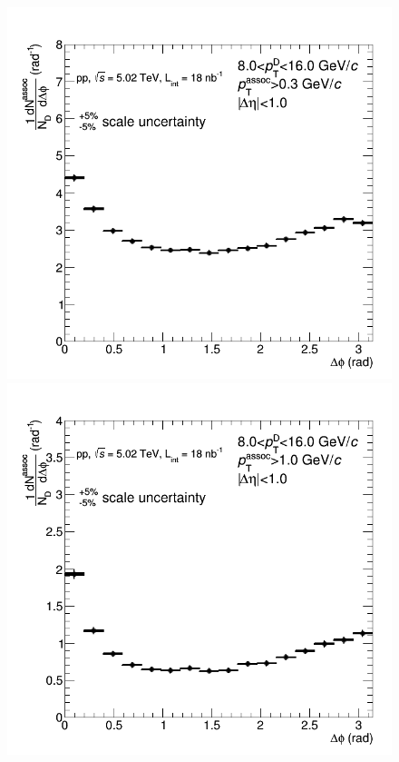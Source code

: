 \begin{figure}[!htbp]
{\includegraphics[width=0.31\linewidth, height=0.23\linewidth]{figures/Averages/CanvaAndVariedHistoWeightedAverageDzeroDstarDplus_pp_Pt8to16assocPtdot3to99dot.png}}
{\includegraphics[width=0.31\linewidth, height=0.23\linewidth]{figures/Averages/CanvaAndVariedHistoWeightedAverageDzeroDstarDplus_pp_Pt8to16assocPt1dotto99dot.png}}
\end{figure}
